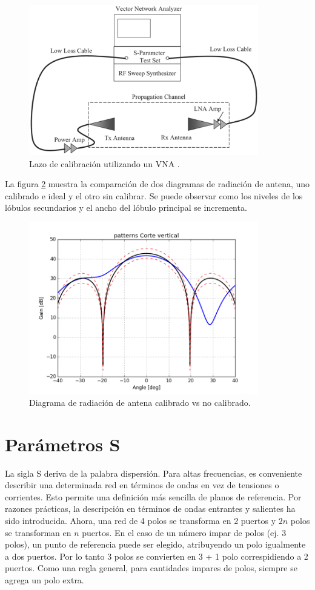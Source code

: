 \begin{figure}[H]
 \centering
 \includegraphics[width=10cm]{gfx/calibrationLoop.png}
 \caption{Lazo de calibración utilizando un VNA \cite{Reed2012}.}
 \label{fig:calibrationLoop}
\end{figure}

La figura \ref{fig:nonCalPattern} muestra la comparación de dos diagramas de radiación de antena, uno calibrado e ideal y el
otro sin calibrar. Se puede observar como los niveles de los lóbulos secundarios y el ancho del lóbulo principal se incrementa.

\begin{figure}[H]
 \centering
 \includegraphics[width=10cm]{gfx/nonCalPattern.png}
 \caption{Diagrama de radiación de antena calibrado vs no calibrado.}
 \label{fig:nonCalPattern}
\end{figure}

\section{Parámetros S}

La sigla S deriva de la palabra dispersión. Para altas frecuencias, es conveniente describir una
determinada red en términos de ondas en vez de tensiones o corrientes. Esto permite una definición más
sencilla de planos de referencia. Por razones prácticas, la descripción en términos de ondas entrantes
y salientes ha sido introducida. Ahora, una red de 4 polos se transforma en 2 puertos y $2n$ polos se
transforman en $n$ puertos. En el caso de un número impar de polos (ej. 3 polos), un punto de referencia
puede ser elegido, atribuyendo un polo igualmente a dos puertos. Por lo tanto 3 polos se convierten en
3 + 1 polo correspidiendo a 2 puertos. Como una regla general, para cantidades impares de polos, siempre
se agrega un polo extra.


